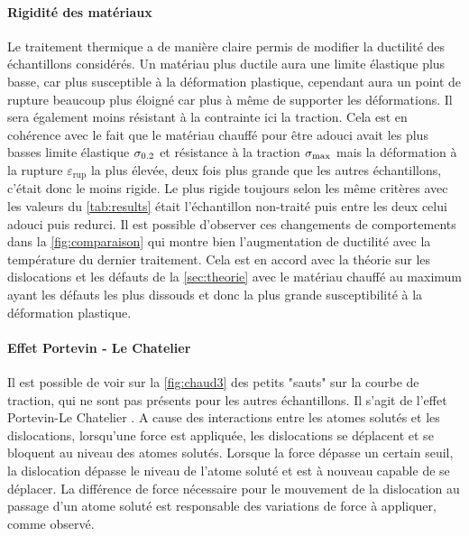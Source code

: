 \paragraph{Rigidité des matériaux}
Le traitement thermique a de manière claire permis de modifier la ductilité des échantillons considérés. Un matériau plus ductile aura une limite élastique plus basse, car plus susceptible à la déformation plastique, cependant aura un point de rupture beaucoup plus éloigné car plus à même de supporter les déformations. Il sera également moins résistant à la contrainte ici la traction. Cela est en cohérence avec le fait que le matériau chauffé pour être adouci avait les plus basses limite élastique $\sigma_{0.2}$ et résistance à la traction $\sigma_\mathrm{max}$ mais la déformation à la rupture $\varepsilon_{\textrm{rup}}$ la plus élevée, deux fois plus grande que les autres échantillons, c'était donc le moins rigide. Le plus rigide toujours selon les même critères avec les valeurs du \autoref{tab:results} était l'échantillon non-traité puis entre les deux celui adouci puis redurci. Il est possible d'observer ces changements de comportements dans la \autoref{fig:comparaison} qui montre bien l'augmentation de ductilité avec la température du dernier traitement. Cela est en accord avec la théorie sur les dislocations et les défauts de la \autoref{sec:theorie} avec le matériau chauffé au maximum ayant les défauts les plus dissouds et donc la plus grande susceptibilité à la déformation plastique.

\paragraph{Effet Portevin - Le Chatelier}
Il est possible de voir sur la \autoref{fig:chaud3} des petits "sauts" sur la courbe de traction, qui ne sont pas présents pour les autres échantillons. Il s'agit de l'effet Portevin-Le Chatelier \cite{Yilmaz_2011}. A cause des interactions entre les atomes solutés et les dislocations, lorsqu'une force est appliquée, les dislocations se déplacent et se bloquent au niveau des atomes solutés. Lorsque la force dépasse un certain seuil, la dislocation dépasse le niveau de l'atome soluté et est à nouveau capable de se déplacer. La différence de force nécessaire pour le mouvement de la dislocation au passage d'un atome soluté est responsable des variations de force à appliquer, comme observé.